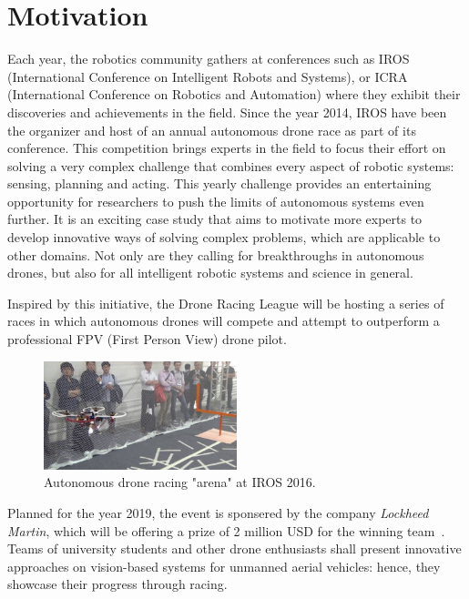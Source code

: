 \section{Motivation}


Each year, the robotics community gathers at conferences such as IROS
(International Conference on Intelligent Robots and Systems), or ICRA
(International Conference on Robotics and Automation) where they
exhibit their discoveries and achievements in the field. Since the year 2014,
IROS have been the organizer and host of an annual autonomous drone race as
part of its conference. This competition brings experts in the field to focus
their effort on solving a very complex challenge that combines every aspect of
robotic systems: sensing, planning and acting. This yearly challenge provides
an entertaining opportunity for researchers to push the limits of autonomous
systems even further. It is an exciting case study that aims to motivate more
experts to develop innovative ways of solving complex problems, which are
applicable to other domains. Not only are they calling for breakthroughs in
autonomous drones, but also for all intelligent robotic systems and science in
general.

Inspired by this initiative, the Drone Racing League will be hosting a series
of races in which autonomous drones will compete and attempt to outperform a
professional FPV (First Person View) drone pilot.\\

\begin{figure}[h]
	\centering
	\includegraphics[width=0.5\textwidth]{figure/iros_2016.jpg}
	\caption{Autonomous drone racing "arena" at IROS 2016.}
	\label{fig:iros}
\end{figure}

Planned for the year 2019, the event is sponsered by the company \emph{Lockheed
Martin}, which will be offering a prize of 2 million USD for the winning
team~\cite{LockheedDRL}. Teams of university students and other drone
enthusiasts shall present innovative approaches on vision-based systems for
unmanned aerial vehicles: hence, they showcase their progress through racing.

